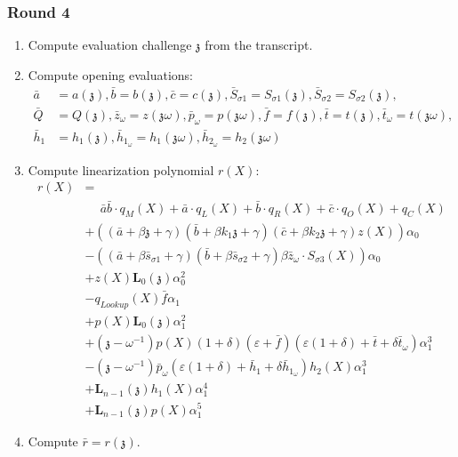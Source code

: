 \documentclass[fleqn]{article}
\begin{document}
			\subsubsection*{Round 4}
	    			\begin{enumerate}
					\item Compute evaluation challenge $\mathfrak{z}$ from the transcript.
					    
					\item Compute opening evaluations:
						\begin{align*}
						\bar{a} &= a(\mathfrak{z}), \bar{b} = b(\mathfrak{z}), \bar{c} = c(\mathfrak{z}), \bar{S}_{\sigma 1} = S_{\sigma 1}(\mathfrak{z}), \bar{S}_{\sigma 2} = S_{\sigma 2}(\mathfrak{z}), \\
						\bar{Q} &= Q(\mathfrak{z}), \bar{z}_\omega = z(\mathfrak{z}\omega), \bar{p}_\omega = p(\mathfrak{z}\omega),  \bar{f} = f(\mathfrak{z}), \bar{t} = t(\mathfrak{z}), \bar{t}_\omega = t(\mathfrak{z}\omega), \\
						\bar{h}_1 &= h_1(\mathfrak{z}), \bar{h}_{1_\omega} = {h}_1(\mathfrak{z}\omega), \bar{h}_{2_\omega} = {h}_2(\mathfrak{z}\omega)
						\end{align*}
					                
					\item Compute linearization polynomial $r(X)$:
						\begin{align*}
						r(X) &= \\
							&\phantom{+}\bar{a} \bar{b}\cdot q_M(X) + \bar{a}\cdot q_L(X) + \bar{b}\cdot q_R(X) + \bar{c}\cdot q_O(X) + q_C(X) \\
							&+((\bar{a} + \beta\mathfrak{z}+\gamma)(\bar{b} + \beta k_1 \mathfrak{z}+\gamma)(\bar{c} + \beta k_2\mathfrak{z}+\gamma)z(X))\alpha_0\\
							&-((\bar{a} + \beta\bar{s}_{\sigma 1}+\gamma)(\bar{b} + \beta\bar{s}_{\sigma 2}+\gamma)\beta\bar{z}_{\omega} \cdot S_{\sigma 3}(X)) \alpha_0 \\
							&+z(X)\textbf{L}_0(\mathfrak{z})\alpha_0^2 \\
							&-q_{Lookup}(X)\bar{f}\alpha_1 \\
							&+p(X)\textbf{L}_0(\mathfrak{z})\alpha_1^2 \\
							&+(\mathfrak{z}-\omega^{-1})p(X)(1+\delta)(\varepsilon+\bar{f})(\varepsilon(1+\delta)+\bar{t}+\delta \bar{t}_\omega)\alpha_1^3 \\
							&-(\mathfrak{z}-\omega^{-1})\bar{p}_\omega(\varepsilon(1+\delta)+\bar{h}_1+\delta \bar{h}_{1_\omega})h_2(X)\alpha_1^3\\
							&+\textbf{L}_{n-1}(\mathfrak{z})h_1(X)\alpha_1^4 \\
							&+\textbf{L}_{n-1}(\mathfrak{z})p(X)\alpha_1^5
						\end{align*}
		                
					\item Compute $\bar{r} = r(\mathfrak{z})$.
				\end{enumerate}
\end{document}
